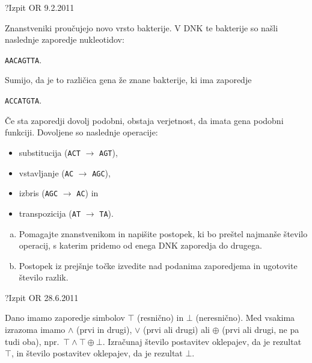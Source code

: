 \begin{naloga}{?}{Izpit OR 9.2.2011}
\begin{vprasanje}
Znanstveniki proučujejo novo vrsto bakterije.
V DNK te bakterije so našli naslednje zaporedje nukleotidov:
\begin{center}
{\tt AACAGTTA}.
\end{center}
Sumijo, da je to različica gena že znane bakterije, ki ima zaporedje
\begin{center}
{\tt ACCATGTA}.
\end{center}
Če sta zaporedji dovolj podobni,
obstaja verjetnost, da imata gena podobni funkciji.
Dovoljene so naslednje operacije:
\begin{itemize}
\item substitucija ({\tt ACT} $\to$ {\tt AGT}),
\item vstavljanje ({\tt AC} $\to$ {\tt AGC}),
\item izbris ({\tt AGC} $\to$ {\tt AC}) in
\item transpozicija ({\tt AT} $\to$ {\tt TA}).
\end{itemize}
\begin{enumerate}[(a)]
\item Pomagajte znanstvenikom in napišite postopek,
ki bo preštel najmanše število operacij,
s katerim pridemo od enega DNK zaporedja do drugega.
\item Postopek iz prejšnje točke izvedite nad podanima zaporedjema
in ugotovite število razlik.
\end{enumerate}
\end{vprasanje}
\begin{odgovor}
\end{odgovor}
\end{naloga}


\begin{naloga}{?}{Izpit OR 28.6.2011}
\begin{vprasanje}
Dano imamo zaporedje simbolov $\top$ (resnično) in $\bot$ (neresnično).
Med vsakima izrazoma imamo $\land$ (prvi in drugi),
$\lor$ (prvi ali drugi) ali $\oplus$ (prvi ali drugi, ne pa tudi oba),
npr.~$\top \land \top \oplus \bot$.
Izračunaj število postavitev oklepajev, da je rezultat $\top$,
in število postavitev oklepajev, da je rezultat $\bot$.
\end{vprasanje}
\begin{odgovor}
\end{odgovor}
\end{naloga}


